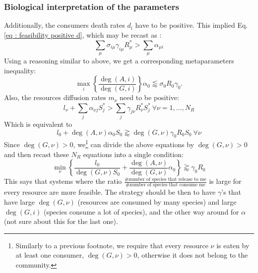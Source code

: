 \documentclass[12pt, titlepage]{report}
\begin{document}
\subsubsection{Biological interpretation of the parameters}
Additionally, the consumers death rates $d_i$ have to be positive. This implied Eq.\eqref{eq : feasibility positive d}, which may be recast as :
\begin{equation}
\sum_\mu \sigma_{i\mu}\gamma_{i\mu}R^*_\mu > \sum_\mu \alpha_{\mu i}
\end{equation}
Using a reasoning similar to above, we get a corresponding metaparameters inequality:
\begin{equation} \label{eq : feasability positivity d}
\boxed{
\max_i\left\{\frac{\deg(A,i)}{\deg(G,i)}\right\} \alpha_0 \lessapprox \sigma_0R_0 \gamma_0
}.
\end{equation}
Also, the resources diffusion rates $m_\nu$ need to be positive:
\begin{equation}
l_\nu + \sum_j \alpha_{\nu j} S^*_j > \sum_j \gamma_{j\nu}R^*_\nu S^*_j \ \forall \nu=1,\dots,N_R
\end{equation}
Which is equivalent to
\begin{equation}
l_0 + \deg(A, \nu) \alpha_0 S_0 \gtrapprox \deg(G,\nu) \gamma_0 R_0 S_0 \ \forall \nu
\end{equation}
Since $\deg(G,\nu)>0$, we\footnote{Similarly to a previous footnote, we require that every resource $\nu$ is eaten by at least one consumer, \ie $\deg(G,\nu)>0$, otherwise it does not belong to the community.} can divide the above equations by $\deg(G,\nu)>0$ and then recast these $N_R$ equations into a single condition:
\begin{equation} \label{eq : feasability positivity m}
\boxed{
\min_\nu\left\{\frac{l_0}{\deg(G,\nu) S_0} + \frac{\deg(A,\nu)}{\deg(G,\nu)}\alpha_0\right\} \gtrapprox \gamma_0 R_0
}
\end{equation}
This says that systems where the ratio $\frac{\#\text{number of species that release to me}}{\#\text{number of species that consume me}}$ is large for every resource are more feasible. The strategy should be then to have $\gamma$'s that have large $\deg(G,\nu)$ (\ie resources are consumed by many species) and large $\deg(G,i)$ (\ie species consume a lot of species), and the other way around for $\alpha$ (not sure about this for the last one).
\end{document}
